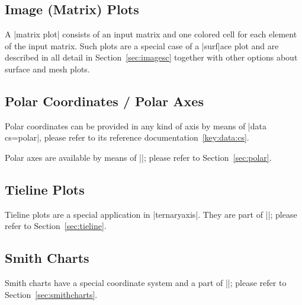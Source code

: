 {\subsection{Image (Matrix) Plots}

A |matrix plot| consists of an input matrix and one colored cell for each
element of the input matrix. Such plots are a special case of a |surf|ace plot
and are described in all detail in Section~\ref{sec:imagesc} together with
other options about surface and mesh plots.


\subsection{Polar Coordinates / Polar Axes}

Polar coordinates can be provided in any kind of axis by means of
|data cs=polar|, please refer to its reference documentation~\ref{key:data:cs}.

Polar axes are available by means of ||; please refer
to Section~\ref{sec:polar}.


\subsection{Tieline Plots}

Tieline plots are a special application in |ternaryaxis|. They are part of
||; please refer to Section~\ref{sec:tieline}.

\subsection{Smith Charts}

Smith charts have a special coordinate system and a part of
||; please refer to
Section~\ref{sec:smithcharts}.
}
